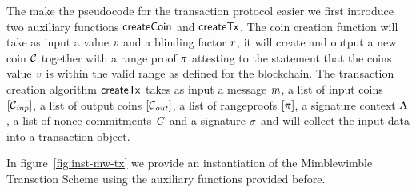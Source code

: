 The make the pseudocode for the transaction protocol easier we first introduce two auxiliary functions $\mathsf{createCoin}$
and $\mathsf{createTx}$. The coin creation function will take as input a value $\mathit{v}$ and a blinding factor $\mathit{r}$, it will create and output a new coin $\mathcal{C}$ together with a range proof
$\pi$ attesting to the statement that the coins value $\mathit{v}$ is within the valid range as defined for the blockchain.
The transaction creation algorithm $\mathsf{createTx}$ takes as input a message $\mathit{m}$, a list of input coins $[\mathcal{C}_{\mathit{inp}}]$, a list of output coins $[\mathcal{C}_{\mathit{out}}]$, a list of rangeproofs
$[\pi]$, a signature context $\Lambda$, a list of nonce commitments $\mathit{C}$ and a signature $\sigma$ and will collect the input data into a transaction object.

\begin{center}
    \fbox{
    \begin{varwidth}{\textwidth}
        \procedure[linenumbering]{$\procCreateCoin{\varValue}{\varBlindingFactor}$} {
        \varCoin \opFunResult \procCommit{\varValue}{\varBlindingFactor} \\
        \varProof \opFunResult \procProof{\varCoin}{\varValue}{\varBlindingFactor} \\
        \pcreturn (\varCoin, \varProof)
        }
        \procedure[linenumbering]{$\procCreatePreTx{\varMsg}{\funArray{\varCoinInp}}{\funArray{\varCoinOut}}{\funArray{\varProof}}{\varSigContext}{\funArray{\varCommitment}}{\varSignature}$}{
        \pcreturn ( \\
        \varMsg \opAssign \varMsg, \\
        \varInputs \opAssign \funArray{\varCoinInp}, \\
        \varOutputs \opAssign \funArray{\varCoinOut}, \\
        \varProofs \opAssign \funArray{\varProof}, \\
        \varSigContext \opAssign \varSigContext, \\
        \varCommits \opAssign \funArray{\varCommitment}, \\
        \varSignature \opAssign \varSignature \\
        )
        }
    \end{varwidth}
    }
\end{center}

In figure~\ref{fig:inst-mw-tx} we provide an instantiation of the Mimblewimble Transction Scheme using the auxiliary functions provided before.

